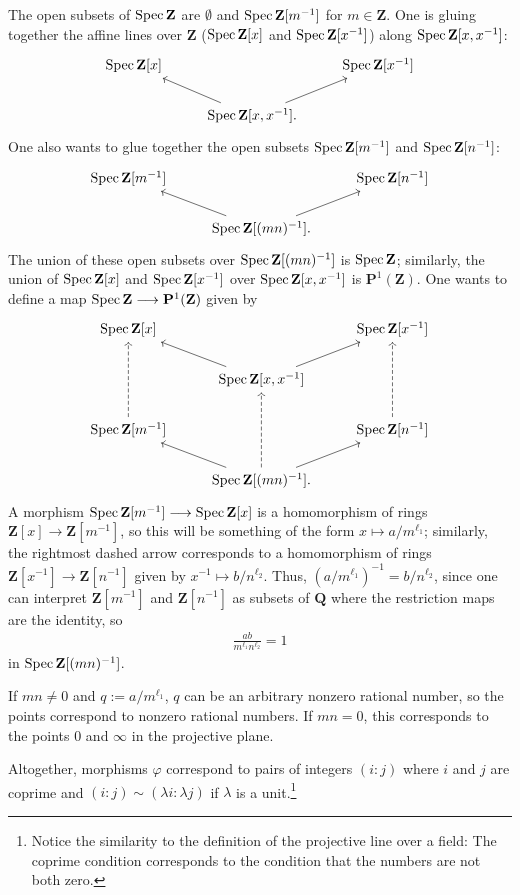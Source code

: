 \documentclass [11 pt, oneside, margin = 1 in] {article}
\begin{document}
\begin{example}[ ]
The open subsets of $\operatorname{Spec} \mathbf{Z}$ are $\emptyset$ and $\operatorname{Spec} \mathbf{Z}[m^{-1}]$ for $m\in \mathbf{Z}$. One is gluing together the affine lines over $\mathbf{Z}$ ($\operatorname{Spec} \mathbf{Z}[x]$ and $\operatorname{Spec} \mathbf{Z}[x^{-1}]$) along $\operatorname{Spec} \mathbf{Z}[x,x^{-1}]$:
\[
\begin{tikzcd}
	\Spec \mathbf{Z}[x] &&\Spec \mathbf{Z}[x^{-1}]\\
			    &\Spec \mathbf{Z}[x,x^{-1}]. \ar[ru]\ar[lu]
\end{tikzcd}
\]
One also wants to glue together the open subsets $\operatorname{Spec} \mathbf{Z}[m^{-1}]$ and $\operatorname{Spec} \mathbf{Z}[n^{-1}]$:
\[
\begin{tikzcd}
	\Spec \mathbf{Z}[m^{-1}] &&\Spec \mathbf{Z}[n^{-1}]\\
	&\Spec \mathbf{Z}[(mn)^{-1}]. \ar[ru]\ar[lu]
\end{tikzcd}
\]
The union of these open subsets over $\operatorname{Spec} \mathbf{Z}[(mn)^{-1}]$ is $\operatorname{Spec} \mathbf{Z}$; similarly, the union of $\operatorname{Spec} \mathbf{Z}[x]$ and $\operatorname{Spec} \mathbf{Z}[x^{-1}]$ over $\operatorname{Spec} \mathbf{Z}[x,x^{-1}]$ is $\mathbf{P}^1(\mathbf{Z})$. One wants to define a map $\operatorname{Spec} \mathbf{Z}\longrightarrow \mathbf{P}^1(\mathbf{Z})$ given by
\[
\begin{tikzcd}
	\Spec \mathbf{Z}[x] &&\Spec \mathbf{Z}[x^{-1}]\\
	&\Spec \mathbf{Z}[x,x^{-1}] \ar[ru]\ar[lu]\\
	\Spec \mathbf{Z}[m^{-1}]\ar[uu, dashed]  &&\Spec \mathbf{Z}[n^{-1}]\ar[uu, dashed]\\
	&\Spec \mathbf{Z}[(mn)^{-1}].\ar[uu, dashed] \ar[ru]\ar[lu]
\end{tikzcd}
\]
A morphism $\operatorname{Spec} \mathbf{Z}[m^{-1}]\longrightarrow \operatorname{Spec} \mathbf{Z}[x]$ is a homomorphism of rings $\mathbf{Z}[x]\longrightarrow \mathbf{Z}[m^{-1}]$, so this will be something of the form $x\longmapsto a/m^{\ell_1}$; similarly, the rightmost dashed arrow corresponds to a homomorphism of rings $\mathbf{Z}[x^{-1}] \longrightarrow \mathbf{Z}[n^{-1}]$ given by $x^{-1}\longmapsto b/n^{\ell_2}$. Thus, $(a/m^{\ell_1}) ^{-1}=b/n^{\ell_2}$, since one can interpret $\mathbf{Z}[m^{-1}]$ and $\mathbf{Z}[n^{-1}]$ as subsets of $\mathbf{Q}$ where the restriction maps are the identity, so
\begin{align*}
	\frac{ab}{m^{\ell_1}n^{\ell_2}}=1
\end{align*}
in $\operatorname{Spec} \mathbf{Z}[(mn) ^{-1}]$.

If $mn\ne 0$ and $q:= a/m^{\ell_1}$, $q$ can be an arbitrary nonzero rational number, so the points correspond to nonzero rational numbers. If $mn=0$, this corresponds to the points $0$ and $\infty$ in the projective plane.

Altogether, morphisms $\varphi$ correspond to pairs of integers $(i:j)$ where $i$ and $j$ are coprime and $(i:j)\sim  (\lambda i :\lambda j)$ if $\lambda$ is a unit.\footnote{Notice the similarity to the definition of the projective line over a field: The coprime condition corresponds to the condition that the numbers are not both zero.}
\end{example}
\end{document}
